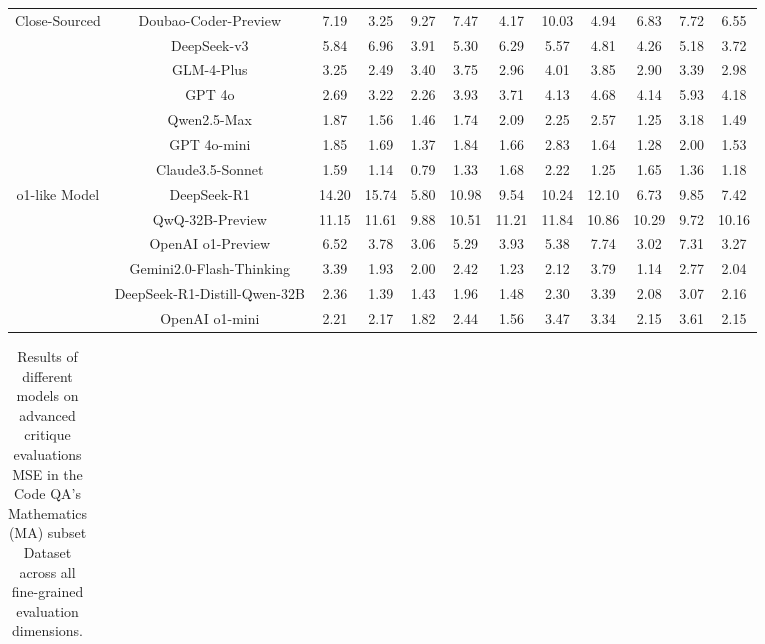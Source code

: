 \documentclass[11pt, a4paper, logo, copyright, nonumbering, amsart]{map}
\begin{document}
\begin{CJK*}{UTF8}{gbsn}
\begin{table*}[h!]
\begin{adjustbox}{width=\textwidth}
\begin{tabular}{c|c|cccccccccc}
    \midrule
    \multirow{7}{*}{Close-Sourced} 
    & Doubao-Coder-Preview & 7.19 & 3.25 & 9.27 & 7.47 & 4.17 & 10.03 & 4.94 & 6.83 & 7.72 & 6.55 \\
    & DeepSeek-v3 & 5.84 & 6.96 & 3.91 & 5.30 & 6.29 & 5.57 & 4.81 & 4.26 & 5.18 & 3.72 \\
    & GLM-4-Plus & 3.25 & 2.49 & 3.40 & 3.75 & 2.96 & 4.01 & 3.85 & 2.90 & 3.39 & 2.98 \\
    & GPT 4o & 2.69 & 3.22 & 2.26 & 3.93 & 3.71 & 4.13 & 4.68 & 4.14 & 5.93 & 4.18 \\
    & Qwen2.5-Max & 1.87 & 1.56 & 1.46 & 1.74 & 2.09 & 2.25 & 2.57 & 1.25 & 3.18 & 1.49 \\
    & GPT 4o-mini & 1.85 & 1.69 & 1.37 & 1.84 & 1.66 & 2.83 & 1.64 & 1.28 & 2.00 & 1.53 \\
    & Claude3.5-Sonnet & 1.59 & 1.14 & 0.79 & 1.33 & 1.68 & 2.22 & 1.25 & 1.65 & 1.36 & 1.18 \\
    
    \midrule
    \multirow{6}{*}{o1-like Model} 
    & DeepSeek-R1 & 14.20 & 15.74 & 5.80 & 10.98 & 9.54 & 10.24 & 12.10 & 6.73 & 9.85 & 7.42 \\
    & QwQ-32B-Preview & 11.15 & 11.61 & 9.88 & 10.51 & 11.21 & 11.84 & 10.86 & 10.29 & 9.72 & 10.16 \\
    & OpenAI o1-Preview & 6.52 & 3.78 & 3.06 & 5.29 & 3.93 & 5.38 & 7.74 & 3.02 & 7.31 & 3.27 \\
    & Gemini2.0-Flash-Thinking & 3.39 & 1.93 & 2.00 & 2.42 & 1.23 & 2.12 & 3.79 & 1.14 & 2.77 & 2.04 \\
    & DeepSeek-R1-Distill-Qwen-32B & 2.36 & 1.39 & 1.43 & 1.96 & 1.48 & 2.30 & 3.39 & 2.08 & 3.07 & 2.16 \\
    & OpenAI o1-mini & 2.21 & 2.17 & 1.82 & 2.44 & 1.56 & 3.47 & 3.34 & 2.15 & 3.61 & 2.15 \\
    \bottomrule
    \end{tabular}
    \end{adjustbox}
\end{table*}

\begin{table*}[h!]
    \centering
    \caption{Results of different models on advanced critique evaluations MSE in the Code QA's Mathematics (MA) subset Dataset across all fine-grained evaluation dimensions.} \label{table:real_level2_ma_dim}
    \begin{adjustbox}{width=\textwidth}
    \begin{tabular}{c|c|cccccccccc}
    

\end{tabular}
\end{adjustbox}
\end{table*}
\end{CJK*}
\end{document}
